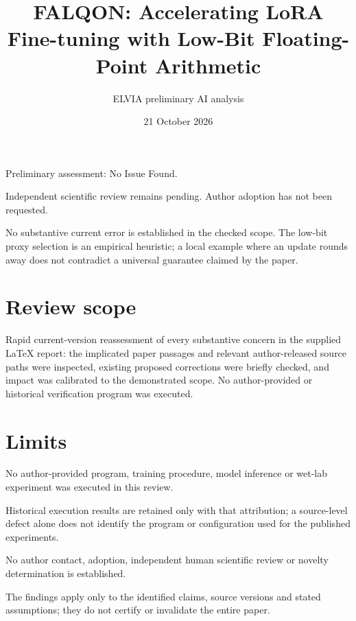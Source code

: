 \documentclass[11pt]{article}
\begin{document}
\title{FALQON: Accelerating LoRA Fine-tuning with Low-Bit Floating-Point Arithmetic}

\author{ELVIA preliminary AI analysis}\date{21 October 2026}\maketitle

Preliminary assessment: No Issue Found.\par

Independent scientific review remains pending. Author adoption has not been requested.

No substantive current error is established in the checked scope. The low-bit proxy selection is an empirical heuristic; a local example where an update rounds away does not contradict a universal guarantee claimed by the paper.

\section*{Review scope}

Rapid current-version reassessment of every substantive concern in the supplied LaTeX report: the implicated paper passages and relevant author-released source paths were inspected, existing proposed corrections were briefly checked, and impact was calibrated to the demonstrated scope. No author-provided or historical verification program was executed.

\section*{Limits}

No author-provided program, training procedure, model inference or wet-lab experiment was executed in this review.\par

Historical execution results are retained only with that attribution; a source-level defect alone does not identify the program or configuration used for the published experiments.\par

No author contact, adoption, independent human scientific review or novelty determination is established.\par

The findings apply only to the identified claims, source versions and stated assumptions; they do not certify or invalidate the entire paper.\par
\end{document}
